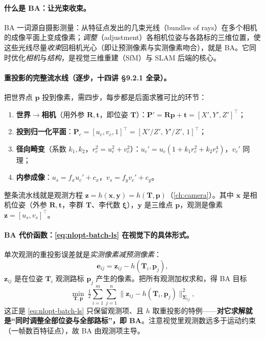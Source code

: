 \paragraph{什么是 BA：让光束收束。}\cite{gaoxiang2019slam14}
BA 一词源自摄影测量：从特征点发出的几束光线（bundles of rays）在多个相机的成像平面上变成像素；\emph{调整}（adjustment）各相机位姿与各路标的三维位置，使这些光线尽量\emph{收束}回相机光心（即让预测像素与实测像素吻合），就是 BA。它同时优化\emph{相机}与\emph{结构}，是视觉三维重建（SfM）与 SLAM 后端的核心。

\paragraph{重投影的完整流水线（逐步，十四讲 §9.2.1 全录）。}\cite{gaoxiang2019slam14}
把世界点 $\mathbf{p}$ 投到像素，需四步，每步都是后面求雅可比的环节：
\begin{enumerate}
  \item \textbf{世界$\to$相机}（用外参 $\mathbf{R},\mathbf{t}$，即位姿 $\mathbf{T}$）：$\mathbf{P}'=\mathbf{R}\mathbf{p}+\mathbf{t}=[X',Y',Z']^\top$；
  \item \textbf{投到归一化平面}：$\mathbf{P}_c=[u_c,v_c,1]^\top=[X'/Z',\,Y'/Z',\,1]^\top$；
  \item \textbf{径向畸变}（系数 $k_1,k_2$，$r_c^2=u_c^2+v_c^2$）：$u_c'=u_c(1+k_1r_c^2+k_2r_c^4)$，$v_c'$ 同理；
  \item \textbf{内参成像}：$u_s=f_x u_c'+c_x$，$v_s=f_y v_c'+c_y$。
\end{enumerate}
整条流水线就是观测方程 $\mathbf{z}=h(\mathbf{x},\mathbf{y})=h(\mathbf{T},\mathbf{p})$（\cref{ch:camera}）。其中 $\mathbf{x}$ 是相机位姿（外参 $\mathbf{R},\mathbf{t}$，李群 $\mathbf{T}$、李代数 $\boldsymbol{\xi}$），$\mathbf{y}$ 是三维点 $\mathbf{p}$，观测是像素 $\mathbf{z}=[u_s,v_s]^\top$。

\paragraph{BA 代价函数：\cref{eq:nlopt-batch-ls} 在视觉下的具体形式。}\cite{gaoxiang2019slam14}
单次观测的重投影误差就是\emph{实测像素减预测像素}：
\begin{equation}
  \mathbf{e}_{ij}=\mathbf{z}_{ij}-h(\mathbf{T}_i,\mathbf{p}_j),
  \label{eq:nlopt-ba-reproj}
\end{equation}
$\mathbf{z}_{ij}$ 是在位姿 $\mathbf{T}_i$ 观测路标 $\mathbf{p}_j$ 产生的像素。把所有观测加权求和，得 BA 目标
\begin{equation}
  \min_{\mathbf{T},\mathbf{p}}\ \tfrac12\sum_{i=1}^{m}\sum_{j=1}^{n}\big\|\mathbf{z}_{ij}-h(\mathbf{T}_i,\mathbf{p}_j)\big\|_{\boldsymbol{\Sigma}_{ij}}^2,
  \label{eq:nlopt-ba-cost}
\end{equation}
这正是 \cref{eq:nlopt-batch-ls} 只保留观测项、且 $h$ 取重投影的特例——\textbf{对它求解就是“同时调整全部位姿与全部路标”，即 BA}。注意视觉里观测数远多于运动约束（一帧数百特征点），故 BA 由观测项主导。

